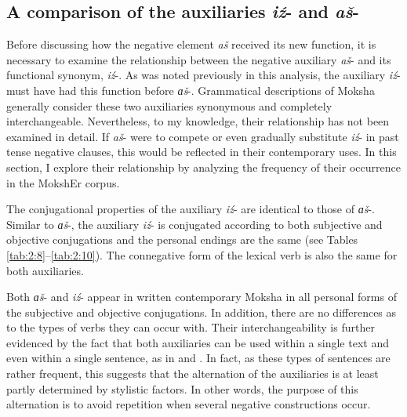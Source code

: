 \documentclass[output=paper,colorlinks,citecolor=brown,draft,draftmode]{langscibook}
\begin{document}
\subsection{A comparison of the auxiliaries \textit{iź}- and \textit{aš}-}\label{sec:2:6.2}

Before discussing how the negative element \textit{aš} received its new function, it is necessary to examine the relationship between the negative auxiliary \textit{aš}- and its functional synonym, \textit{iź}-. As was noted previously in this analysis, the auxiliary \textit{iź}- must have had this function before \textit{ɑš}-. Grammatical descriptions of Moksha generally consider these two auxiliaries synonymous and completely interchangeable. Nevertheless, to my knowledge, their relationship has not been examined in detail. If \textit{aš}- were to compete or even gradually substitute \textit{iź}- in past tense negative clauses, this would be reflected in their contemporary uses. In this section, I explore their relationship by analyzing the frequency of their occurrence in the MokshEr corpus.

  The conjugational properties of the auxiliary \textit{iź}- are identical to those of \mbox{\textit{ɑš}-.}
  Similar to \textit{ɑš}-, the auxiliary \textit{iź}- is conjugated according to both subjective and objective conjugations and the personal endings are the same (see Tables \ref{tab:2:8}--\ref{tab:2:10}). The connegative form of the lexical verb is also the same for both auxiliaries. 

Both \textit{ɑš}- and \textit{iź}- appear in written contemporary Moksha in all personal forms of the subjective and objective conjugations. In addition, there are no differences as to the types of verbs they can occur with. Their interchangeability is further evidenced by the fact that both auxiliaries can be used within a single text and even within a single sentence, as in  and . In fact, as these types of sentences are rather frequent, this suggests that the alternation of the auxiliaries is at least partly determined by stylistic factors. In other words, the purpose of this alternation is to avoid repetition when several negative constructions occur.
\end{document}
